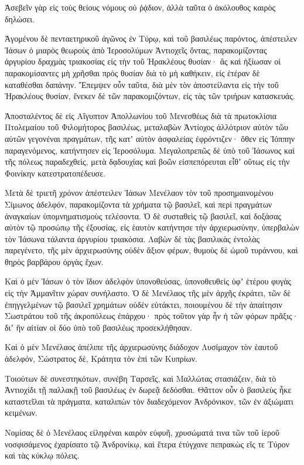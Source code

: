 {Ἀσεβεῖν γὰρ εἰς τοὺς θείους νόμους οὐ ῥᾴδιον, ἀλλὰ ταῦτα ὁ ἀκόλουθος καιρὸς δηλώσει.
\par }{\PP {}Ἀγομένου δὲ πενταετηρικοῦ ἀγῶνος ἐν Τύρῳ, καὶ τοῦ βασιλέως παρόντος,
ἀπέστειλεν Ἰάσων ὁ μιαρὸς θεωροὺς ἀπὸ Ἱεροσολύμων Ἀντιοχεῖς ὄντας, παρακομίζοντας ἀργυρίου δραχμὰς τριακοσίας εἰς τὴν τοῦ Ἡρακλέους θυσίαν· ἃς καὶ ἠξίωσαν οἱ παρακομίσαντες μὴ χρῆσθαι πρὸς θυσίαν διὰ τὸ μὴ καθήκειν, εἰς ἑτέραν δὲ καταθέσθαι δαπάνην.
Ἔπεμψεν οὖν ταῦτα, διὰ μὲν τὸν ἀποστείλαντα εἰς τὴν τοῦ Ἡρακλέους θυσίαν, ἕνεκεν δὲ τῶν παρακομιζόντων, εἰς τὰς τῶν τριήρων κατασκευάς.
\par }{\PP {}Ἀποσταλέντος δὲ εἰς Αἴγυπτον Ἀπολλωνίου τοῦ Μενεσθέως διὰ τὰ πρωτοκλίσια Πτολεμαίου τοῦ Φιλομήτορος βασιλέως, μεταλαβὼν Ἀντίοχος ἀλλότριον αὐτὸν τῶυ αὐτῶν γεγονέναι πραγμάτων, τῆς κατʼ αὑτὸν ἀσφαλείας ἐφρόντιζεν· ὅθεν εἰς Ἰόππην παραγενόμενος, κατήντησεν εἰς Ἰεροσόλυμα.
Μεγαλοπρεπῶς δὲ ὑπὸ τοῦ Ἰάσωνος καὶ τῆς πόλεως παραδεχθεὶς, μετὰ δᾳδουχίας καὶ βοῶν εἰσπεπόρευται εἶθʼ οὕτως εἰς τὴν Φοινίκην κατεστρατοπέδευσε.
\par }{\PP {}Μετὰ δὲ τριετῆ χρόνον ἀπέστειλεν Ἰάσων Μενέλαον τὸν τοῦ προσημαινομένου Σίμωνος ἀδελφόν, παρακομίζοντα τὰ χρήματα τῷ βασιλεῖ, καὶ περὶ πραγμάτων ἀναγκαίων ὑπομνηματισμοὺς τελέσοντα.
Ὁ δὲ συσταθεὶς τῷ βασιλεῖ, καὶ δοξάσας αὐτὸν τῷ προσώπῳ τῆς ἐξουσίας, εἰς ἑαυτὸν κατήντησε τὴν ἀρχιερωσύνην, ὑπερβαλὼν τὸν Ἰάσωνα τάλαντα ἀργυρίου τριακόσια.
Λαβὼν δὲ τὰς βασιλικὰς ἐντολὰς παρεγένετο, τῆς μὲν ἀρχιερωσύνης οὐδὲν ἄξιον φέρων, θυμοὺς δὲ ὠμοῦ τυράννου, καὶ θηρὸς βαρβάρου ὀργὰς ἔχων.
\par }{\PP {}Καὶ ὁ μὲν Ἰάσων ὁ τὸν ἴδιον ἀδελφὸν ὑπονοθεύσας, ὑπονοθευθεὶς ὑφʼ ἑτέρου φυγὰς εἰς τὴν Ἀμμανῖτιν χώραν συνήλαστο.
Ὁ δὲ Μενέλαος τῆς μὲν ἀρχῆς ἐκράτει, τῶν δὲ ἐπηγγελμένων τῷ βασιλεῖ χρημάτων οὐδὲν εὐτάκτει,
ποιουμένου δὲ τὴν ἀπαίτησιν Σωστράτου τοῦ τῆς ἀκροπόλεως ἐπάρχου· πρὸς τοῦτον γὰρ ἦν ἡ τῶν φόρων πρᾶξις· διʼ ἣν αἰτίαν οἱ δύο ὑπὸ τοῦ βασιλέως προσεκλήθησαν.
\par }{\PP {}Καὶ ὁ μὲν Μενέλαος ἀπέλιπε τῆς ἀρχιερωσύνης διάδοχον Λυσίμαχον τὸν ἑαυτοῦ ἀδελφόν, Σώστρατος δὲ, Κράτητα τὸν ἐπὶ τῶν Κυπρίων.
\par }{\PP {}Τοιούτων δὲ συνεστηκότων, συνέβη Ταρσεῖς, καὶ Μαλλώτας στασιάζειν, διὰ τὸ Ἀντιοχίδι τῇ παλλακῇ τοῦ βασιλέως ἐν δωρεᾷ δεδόσθαι.
Θᾶττον οὖν ὁ βασιλεὺς ἧκε καταστεῖλαι τὰ πράγματα, καταλιπὼν τὸν διαδεχόμενον Ἀνδρόνικον, τῶν ἐν ἀξιώματι κειμένων.
\par }{\PP {}Νομίσας δὲ ὁ Μενέλαος εἰληφέναι καιρὸν εὐφυῆ, χρυσώματά τινα τῶν τοῦ ἱεροῦ νοσφισάμενος ἐχαρίσατο τῷ Ἀνδρονίκῳ, καὶ ἕτερα ἐτύγχανε πεπρακὼς εἴς τε Τύρον καὶ τὰς κύκλῳ πόλεις.
}
